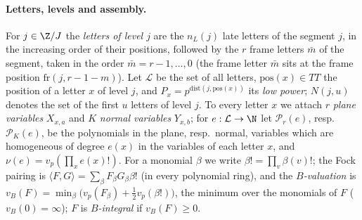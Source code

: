 \paragraph{Letters, levels and assembly.} For $j\in\Z/J$ the \emph{letters of level $j$} are the $n_L(j)$ late letters of the
segment $j$, in the increasing order of their positions, followed by the $r$ frame letters $\bar m$ of the segment, taken in
the order $\bar m=r-1,\dots,0$ (the frame letter $\bar m$ sits at the frame position $\mathrm{fr}(j,r-1-m)$). Let $\mathcal L$
be the set of all letters, $\mathrm{pos}(x)\in TT$ the position of a letter $x$ of level $j$, and
$P_x=p^{\mathrm{dist}(j,\mathrm{pos}(x))}$ its \emph{low power}; $N(j,u)$ denotes the set of the first $u$ letters of level
$j$. To every letter $x$ we attach $r$ \emph{plane variables} $X_{x,a}$ and $K$ \emph{normal variables} $Y_{x,b}$; for
$e:\mathcal L\to\N$ let $\mathcal P_r(e)$, resp.\ $\mathcal P_K(e)$, be the polynomials in the plane, resp.\ normal,
variables which are homogeneous of degree $e(x)$ in the variables of each letter $x$, and $\nu(e)=v_p(\prod_xe(x)!)$. For a
monomial $\beta$ we write $\beta!=\prod_v\beta(v)!$; the Fock pairing is $\langle F,G\rangle=\sum_\beta F_\beta G_\beta\beta!$ (in every
polynomial ring), and the \emph{$B$-valuation} is $v_B(F)=\min_{\beta}\bigl(v_p(F_\beta)+\frac12v_p(\beta!)\bigr)$, the minimum over the
monomials of $F$ ($v_B(0)=\infty$); $F$ is \emph{$B$-integral} if $v_B(F)\ge0$.

